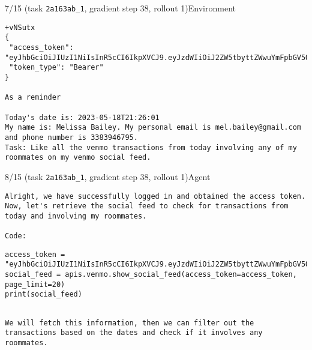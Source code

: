 \hspace*{8mm}%
\begin{minipage}{0.95\linewidth}
\begin{user_message_box}{{7/15 (task \texttt{2a163ab\_1}, gradient step 38, rollout 1)\hfill Environment}}
\scriptsize
\begin{Verbatim}[breaklines]
+vNSutx
{
 "access_token": "eyJhbGciOiJIUzI1NiIsInR5cCI6IkpXVCJ9.eyJzdWIiOiJ2ZW5tbyttZWwuYmFpbGV5QGdtYWlsLmNvbSIsImV4cCI6MTY4NDQ0NjA1OX0.B34zBX595hORJCaftkDSSPtAddAftuFovXV_kaqBs9A",
 "token_type": "Bearer"
}

As a reminder

Today's date is: 2023-05-18T21:26:01
My name is: Melissa Bailey. My personal email is mel.bailey@gmail.com and phone number is 3383946795.
Task: Like all the venmo transactions from today involving any of my roommates on my venmo social feed.
\end{Verbatim}
\end{user_message_box}
\end{minipage}

\begin{minipage}{0.95\linewidth}
\begin{assistant_message_box}{{8/15 (task \texttt{2a163ab\_1}, gradient step 38, rollout 1)\hfill Agent}}
\scriptsize
\begin{Verbatim}[breaklines]
Alright, we have successfully logged in and obtained the access token. Now, let's retrieve the social feed to check for transactions from today and involving my roommates.

Code:
\end{Verbatim}
\begin{tcolorbox}[colback=codebgcolor,boxrule=0pt]\begin{Verbatim}[breaklines]
access_token = "eyJhbGciOiJIUzI1NiIsInR5cCI6IkpXVCJ9.eyJzdWIiOiJ2ZW5tbyttZWwuYmFpbGV5QGdtYWlsLmNvbSIsImV4cCI6MTY4NDQ0NjA1OX0.B34zBX595hORJCaftkDSSPtAddAftuFovXV_kaqBs9A"
social_feed = apis.venmo.show_social_feed(access_token=access_token, page_limit=20)
print(social_feed)

\end{Verbatim}
\end{tcolorbox}\begin{Verbatim}[breaklines]

We will fetch this information, then we can filter out the transactions based on the dates and check if it involves any roommates.
\end{Verbatim}
\end{assistant_message_box}
\end{minipage}

